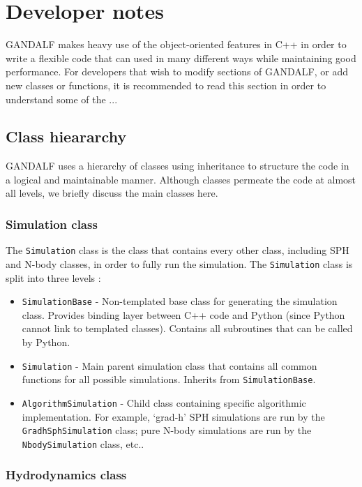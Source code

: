 \documentclass[a4paper]{article}
\newcommand{\var}[1]{\texttt{#1}}
\begin{document}
\newpage


\section{Developer notes}
GANDALF makes heavy use of the object-oriented features in C++ in order to write a flexible code that can used in many different ways while maintaining good performance.  For developers that wish to modify sections of GANDALF, or add new classes or functions, it is recommended to read this section in order to understand some of the ...


\subsection{Class hieararchy}
GANDALF uses a hierarchy of classes using inheritance to structure the code in a logical and maintainable manner.  Although classes permeate the code at almost all levels, we briefly discuss the main classes here.

\subsubsection{Simulation class}
The \var{Simulation} class is the class that contains every other class, including SPH and N-body classes, in order to fully run the simulation.  The \var{Simulation} class is split into three levels :
\begin{itemize}
\item \var{SimulationBase} - Non-templated base class for generating the simulation class.  Provides binding layer between C++ code and Python (since Python cannot link to templated classes).  Contains all subroutines that can be called by Python.
\item \var{Simulation} - Main parent simulation class that contains all common functions for all possible simulations.  Inherits from \var{SimulationBase}.
\item \var{AlgorithmSimulation} - Child class containing specific algorithmic implementation.  For example, `grad-h' SPH simulations are run by the \var{GradhSphSimulation} class; pure N-body simulations are run by the \var{NbodySimulation} class, etc..
\end{itemize}

\subsubsection{Hydrodynamics class}
\end{document}
